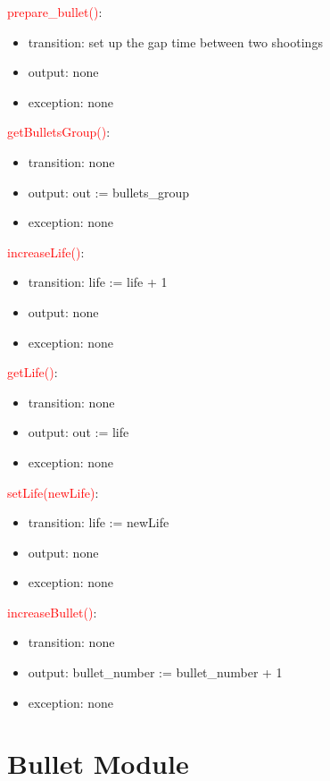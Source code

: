 \documentclass[12pt]{article}
\begin{document}
\noindent \textcolor{red}{prepare\_bullet()}:
\begin{itemize}
\item transition: set up the gap time  between two shootings
\item output: none
\item exception: none
\end{itemize}

\noindent \textcolor{red}{getBulletsGroup()}:
\begin{itemize}
\item transition: none
\item output: out := bullets\_group
\item exception: none
\end{itemize}

\noindent \textcolor{red}{increaseLife()}:
\begin{itemize}
\item transition: life := life + 1
\item output: none
\item exception: none
\end{itemize}

\noindent \textcolor{red}{getLife()}:
\begin{itemize}
\item transition: none
\item output: out := life
\item exception: none
\end{itemize}

\noindent \textcolor{red}{setLife(newLife)}:
\begin{itemize}
\item transition: life := newLife
\item output: none
\item exception: none
\end{itemize}

\noindent \textcolor{red}{increaseBullet()}:
\begin{itemize}
\item transition: none
\item output: bullet\_number := bullet\_number + 1
\item exception: none
\end{itemize}

\newpage

\section{Bullet Module}
\end{document}
